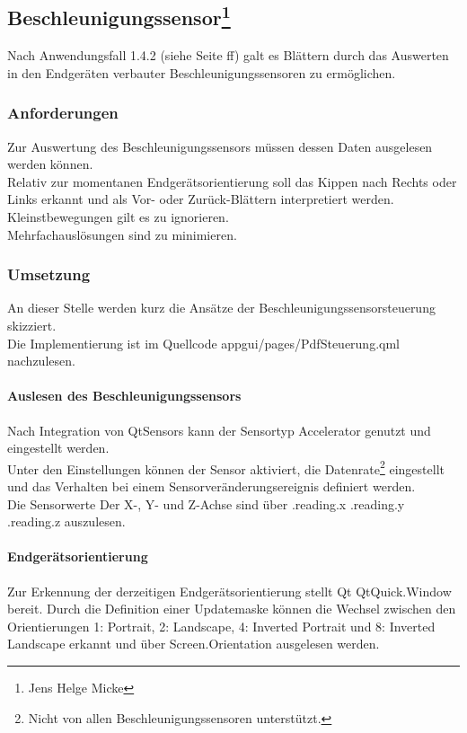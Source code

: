 \subsection[Beschleunigungssensor]{Beschleunigungssensor\footnote{Jens Helge Micke}}
\thispagestyle{fancy}
\label{Beschleunigungssensor}
Nach Anwendungsfall 1.4.2 (siehe Seite \pageref{Anwendungsfälle} ff) galt es Blättern durch das Auswerten in den Endgeräten verbauter Beschleunigungssensoren zu ermöglichen.

\subsubsection{Anforderungen}
\label{BeschleunigungssensorAnforderungen}
Zur Auswertung des Beschleunigungssensors müssen dessen Daten ausgelesen werden können.\\
Relativ zur momentanen Endgerätsorientierung soll das Kippen nach Rechts oder Links erkannt und als Vor- oder Zurück-Blättern interpretiert werden.\\
Kleinstbewegungen gilt es zu ignorieren.\\
Mehrfachauslösungen sind zu minimieren.

\subsubsection{Umsetzung}
\label{BeschleunigungssensorUmsetzung}
An dieser Stelle werden kurz die Ansätze der Beschleunigungssensorsteuerung skizziert.\\
Die Implementierung ist im Quellcode app\textunderscore gui/pages/PdfSteuerung.qml nachzulesen.
\paragraph{Auslesen des Beschleunigungssensors}$\;$\\
Nach Integration von QtSensors kann der Sensortyp Accelerator genutzt und eingestellt werden.\\
Unter den Einstellungen können der Sensor aktiviert, die Datenrate\footnote{Nicht von allen Beschleunigungssensoren unterstützt.} eingestellt und das Verhalten bei einem Sensorveränderungsereignis definiert werden.\\
Die Sensorwerte Der X-, Y- und Z-Achse sind über .reading.x .reading.y .reading.z auszulesen.
\paragraph{Endgerätsorientierung}$\;$\\
Zur Erkennung der derzeitigen Endgerätsorientierung stellt Qt QtQuick.Window bereit.
Durch die Definition einer Updatemaske können die Wechsel zwischen den Orientierungen 1: Portrait, 2: Landscape, 4: Inverted Portrait und 8: Inverted Landscape erkannt und über Screen.Orientation ausgelesen werden.
